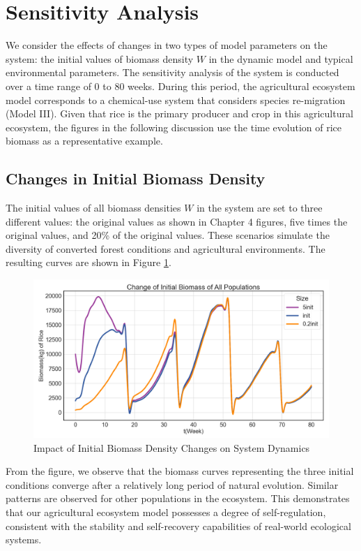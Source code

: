 \documentclass{HZNUMCM}
\begin{document}
  \section{Sensitivity Analysis}
    We consider the effects of changes in two types of model parameters on the system: 
    the initial values of biomass density \( W \) in the dynamic model and typical environmental parameters. 
    The sensitivity analysis of the system is conducted over a time range of 0 to 80 weeks. 
    During this period, the agricultural ecosystem model corresponds to a chemical-use system that considers species re-migration (Model III). 
    Given that rice is the primary producer and crop in this agricultural ecosystem, 
    the figures in the following discussion use the time evolution of rice biomass as a representative example.

    \subsection{Changes in Initial Biomass Density}
      The initial values of all biomass densities \( W \) in the system are set to three different values: 
      the original values as shown in Chapter 4 figures, five times the original values, and 20\% of the original values. 
      These scenarios simulate the diversity of converted forest conditions and agricultural environments. 
      The resulting curves are shown in Figure \ref{fig:Change_init}.

      \begin{figure}[H]
        \centering
        \includegraphics[width=0.75\linewidth]{images/Change_init.png}
        \caption{Impact of Initial Biomass Density Changes on System Dynamics}
        \label{fig:Change_init}
      \end{figure}

      From the figure, we observe that the biomass curves representing the three initial conditions converge after a relatively long period of natural evolution. 
      Similar patterns are observed for other populations in the ecosystem. 
      This demonstrates that our agricultural ecosystem model possesses a degree of self-regulation, 
      consistent with the stability and self-recovery capabilities of real-world ecological systems.
\end{document}
